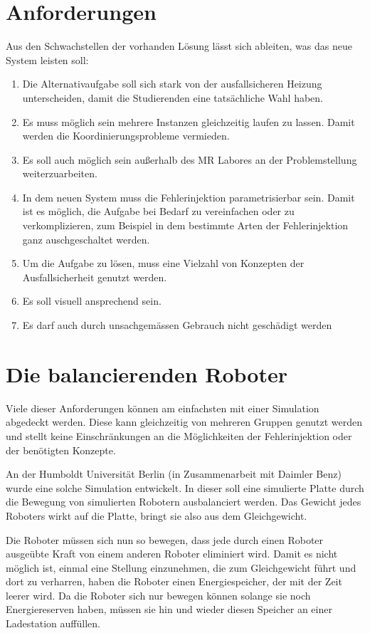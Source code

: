 \section{Anforderungen}\label{anforderung}
Aus den Schwachstellen der vorhanden L{\"{o}}sung l{\"{a}}sst sich ableiten, was das neue System leisten soll:
\begin{enumerate}
	\item Die Alternativaufgabe soll sich stark von der ausfallsicheren Heizung unterscheiden, damit die Studierenden eine tats{\"{a}}chliche Wahl haben.
	\item Es muss m{\"{o}}glich sein mehrere Instanzen gleichzeitig laufen zu lassen. Damit werden die Koordinierungsprobleme vermieden.
	\item Es soll auch m{\"{o}}glich sein au{\ss}erhalb des MR Labores an der Problemstellung weiterzuarbeiten.
	\item In dem neuen System muss die Fehlerinjektion parametrisierbar sein. Damit ist es m{\"{o}}glich,
		die Aufgabe bei Bedarf zu vereinfachen oder zu verkomplizieren, zum Beispiel in dem bestimmte
		Arten der Fehlerinjektion ganz auschgeschaltet werden.
	\item Um die Aufgabe zu l{\"{o}}sen, muss eine Vielzahl von Konzepten der Ausfallsicherheit genutzt werden.
	\item Es soll visuell ansprechend sein.
	\item Es darf auch durch unsachgem{\"{a}}ssen Gebrauch nicht gesch{\"{a}}digt werden
\end{enumerate}

\clearpage
\section{Die balancierenden Roboter}
Viele dieser Anforderungen k{\"{o}}nnen am einfachsten mit einer Simulation abgedeckt werden. Diese kann gleichzeitig
von mehreren Gruppen genutzt werden und stellt keine Einschr{\"{a}}nkungen an die M{\"{o}}glichkeiten der Fehlerinjektion
oder der ben{\"{o}}tigten Konzepte.

An der Humboldt Universit{\"{a}}t Berlin (in Zusammenarbeit mit Daimler Benz) wurde eine solche
Simulation\cite{Werner00} entwickelt. In dieser soll eine simulierte Platte durch die Bewegung von 
simulierten Robotern ausbalanciert werden. Das Gewicht jedes Roboters wirkt auf die Platte, bringt sie also
aus dem Gleichgewicht.

Die Roboter m{\"{u}}ssen sich nun so bewegen, dass jede durch einen Roboter ausge{\"{u}}bte Kraft von einem
anderen Roboter eliminiert wird. Damit es nicht m{\"{o}}glich ist, einmal eine Stellung einzunehmen,
die zum Gleichgewicht f{\"{u}}hrt und dort zu verharren, haben die Roboter einen Energiespeicher, der
mit der Zeit leerer wird. Da die Roboter sich nur bewegen k{\"{o}}nnen solange sie noch Energiereserven haben, 
m{\"{u}}ssen sie hin und wieder diesen Speicher an einer Ladestation auff{\"{u}}llen.


